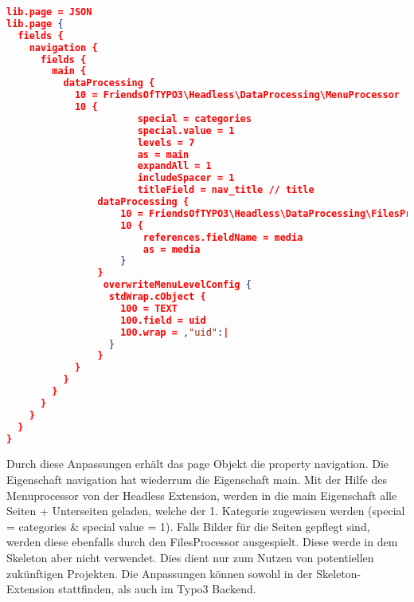 \begin{lstlisting}[language=json,firstnumber=1]
lib.page = JSON
lib.page {
  fields {
    navigation {
      fields {
        main {
          dataProcessing {
            10 = FriendsOfTYPO3\Headless\DataProcessing\MenuProcessor
            10 {              
				       special = categories
				       special.value = 1
				       levels = 7
				       as = main
				       expandAll = 1
				       includeSpacer = 1
				       titleField = nav_title // title	
              	dataProcessing {
                	10 = FriendsOfTYPO3\Headless\DataProcessing\FilesProcessor
                	10 {
                  		references.fieldName = media
                  		as = media
                	}
              	}
                 overwriteMenuLevelConfig {
                  stdWrap.cObject {
                    100 = TEXT
                    100.field = uid
                    100.wrap = ,"uid":|
                  }
                }   
            }
          }
        }
      }      
    }
  }
}
\end{lstlisting}
Durch diese Anpassungen erhält das page Objekt die property navigation. Die Eigenschaft navigation hat wiederrum die Eigenschaft main. Mit der Hilfe des Menuprocessor von der Headless Extension, werden in die main Eigenschaft alle Seiten + Unterseiten geladen, welche der 1. Kategorie zugewiesen werden (special = categories \& special value = 1). Falls Bilder für die Seiten gepflegt sind, werden diese ebenfalls durch den FilesProcessor ausgespielt. Diese werde in dem Skeleton aber nicht verwendet. Dies dient nur zum Nutzen von potentiellen zukünftigen Projekten. Die Anpassungen können sowohl in der Skeleton-Extension stattfinden, als auch im Typo3 Backend.

